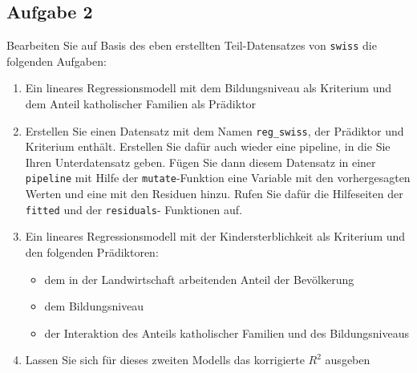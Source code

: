 \documentclass[
]{book}
\providecommand{\tightlist}{%
  \setlength{\itemsep}{0pt}\setlength{\parskip}{0pt}}
\begin{document}
\hypertarget{aufgabe-2-1}{%
\subsection{Aufgabe 2}\label{aufgabe-2-1}}

Bearbeiten Sie auf Basis des eben erstellten Teil-Datensatzes von \texttt{swiss} die folgenden Aufgaben:

\begin{enumerate}
\def\labelenumi{\arabic{enumi}.}
\item
  Ein lineares Regressionsmodell mit dem Bildungsniveau als Kriterium und dem Anteil katholischer Familien als Prädiktor
\item
  Erstellen Sie einen Datensatz mit dem Namen \texttt{reg\_swiss}, der Prädiktor und Kriterium enthält. Erstellen Sie dafür auch wieder eine pipeline, in die Sie Ihren Unterdatensatz geben. Fügen Sie dann diesem Datensatz in einer \texttt{pipeline} mit Hilfe der \texttt{mutate}-Funktion eine Variable mit den vorhergesagten Werten und eine mit den Residuen hinzu. Rufen Sie dafür die Hilfeseiten der \texttt{fitted} und der \texttt{residuals}- Funktionen auf.
\item
  Ein lineares Regressionsmodell mit der Kindersterblichkeit als Kriterium und den folgenden Prädiktoren:

  \begin{itemize}
  \tightlist
  \item
    dem in der Landwirtschaft arbeitenden Anteil der Bevölkerung
  \item
    dem Bildungsniveau
  \item
    der Interaktion des Anteils katholischer Familien und des Bildungsniveaus
  \end{itemize}
\item
  Lassen Sie sich für dieses zweiten Modells das korrigierte \(R^2\) ausgeben
\end{enumerate}
\end{document}
